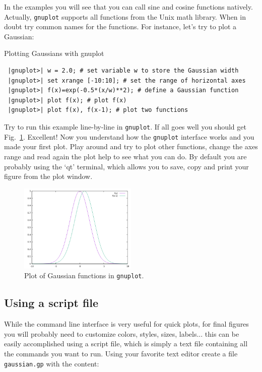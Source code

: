 In the examples you will see that you can call sine and cosine functions natively. Actually, \texttt{gnuplot} supports all functions from the Unix math library. When in doubt try common names for the functions. For instance, let's try to plot a Gaussian:

\begin{example}{Plotting Gaussians with gnuplot}
\begin{verbatim}
 |gnuplot>| w = 2.0; # set variable w to store the Gaussian width
 |gnuplot>| set xrange [-10:10]; # set the range of horizontal axes
 |gnuplot>| f(x)=exp(-0.5*(x/w)**2); # define a Gaussian function
 |gnuplot>| plot f(x); # plot f(x)
 |gnuplot>| plot f(x), f(x-1); # plot two functions
\end{verbatim}
\end{example}

Try to run this example line-by-line in \texttt{gnuplot}. If all goes well you should get Fig.~\ref{fig:gnuplotgaussian}. Excellent! Now you understand how the \texttt{gnuplot} interface works and you made your first plot. Play around and try to plot other functions, change the axes range and read again the plot help to see what you can do. By default you are probably using the `qt' terminal, which allows you to save, copy and print your figure from the plot window.

\begin{figure}[ht!]
 \centering
 \includegraphics[width=0.5\textwidth]{gnuplot-gaussian.png}
 \caption{Plot of Gaussian functions in \texttt{gnuplot}.}
 \label{fig:gnuplotgaussian}
\end{figure}

\subsection{Using a script file}

While the command line interface is very useful for quick plots, for final figures you will probably need to customize colors, styles, sizes, labels... this can be easily accomplished using a script file, which is simply a text file containing all the commands you want to run. Using your favorite text editor create a file \texttt{gaussian.gp} with the content:

